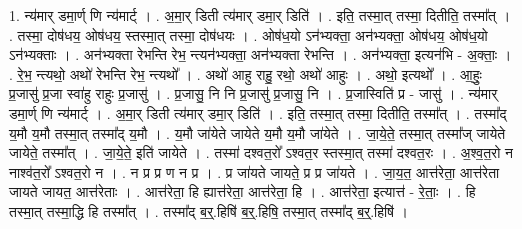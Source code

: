 \documentclass[17pt]{extarticle}
\begin{document}
1. न्य॑मार् डमा॒र्ण् णि न्य॑मार्ट् । . अ॒मा॒र् डिती त्य॑मार् डमा॒र् डिति॑ । . इति॒ तस्मा॒त् तस्मा॒ दितीति॒ तस्मा᳚त् । . तस्मा॒ दोष॑धय॒ ओष॑धय॒ स्तस्मा॒त् तस्मा॒ दोष॑धयः । . ओष॑ध॒यो ऽन॑भ्यक्ता॒ अन॑भ्यक्ता॒ ओष॑धय॒ ओष॑ध॒यो ऽन॑भ्यक्ताः । . अन॑भ्यक्ता रेभन्ति रेभ॒ न्त्यन॑भ्यक्ता॒ अन॑भ्यक्ता रेभन्ति । . अन॑भ्यक्ता॒ इत्यन॑भि - अ॒क्ताः॒ । . रे॒भ॒ न्त्यथो॒ अथो॑ रेभन्ति रेभ॒ न्त्यथो᳚ । . अथो॑ आहु राहु॒ रथो॒ अथो॑ आहुः । . अथो॒ इत्यथो᳚ । . आ॒हुः॒ प्र॒जासु॑ प्र॒जा स्वा॑हु राहुः प्र॒जासु॑ । . प्र॒जासु॒ नि नि प्र॒जासु॑ प्र॒जासु॒ नि । . प्र॒जास्विति॑ प्र - जासु॑ । . न्य॑मार् डमा॒र्ण् णि न्य॑मार्ट् । . अ॒मा॒र् डिती त्य॑मार् डमा॒र् डिति॑ । . इति॒ तस्मा॒त् तस्मा॒ दितीति॒ तस्मा᳚त् । . तस्मा᳚द् य॒मौ य॒मौ तस्मा॒त् तस्मा᳚द् य॒मौ । . य॒मौ जा॑येते जायेते य॒मौ य॒मौ जा॑येते । . जा॒ये॒ते॒ तस्मा॒त् तस्मा᳚ज् जायेते जायेते॒ तस्मा᳚त् । . जा॒ये॒ते॒ इति॑ जायेते । . तस्मा॑ दश्वत॒रो᳚ ऽश्वत॒र स्तस्मा॒त् तस्मा॑ दश्वत॒रः । . अ॒श्व॒त॒रो न नाश्व॑त॒रो᳚ ऽश्वत॒रो न । . न प्र प्र ण न प्र । . प्र जा॑यते जायते॒ प्र प्र जा॑यते । . जा॒य॒त॒ आत्त॑रेता॒ आत्त॑रेता जायते जायत॒ आत्त॑रेताः । . आत्त॑रेता॒ हि ह्यात्त॑रेता॒ आत्त॑रेता॒ हि । . आत्त॑रेता॒ इत्यात्त॑ - रे॒ताः॒ । . हि तस्मा॒त् तस्मा॒द्धि हि तस्मा᳚त् । . तस्मा᳚द् ब॒र्॒.हिषि॑ ब॒र्॒.हिषि॒ तस्मा॒त् तस्मा᳚द् ब॒र्॒.हिषि॑ । \newline
\end{document}
